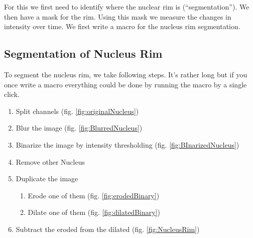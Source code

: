 \documentclass[11pt,a4paper,oneside]{report}
\begin{document}
For this we first need to identify where the nuclear rim is (``segmentation''). We then have a mask for the rim. Using this mask we measure the changes in intensity over time. We first write a macro for the nucleus rim segmentation. 

\subsection{Segmentation of Nucleus Rim}

To segment the nucleus rim, we take following steps. It's rather long but if you once write a macro everything could be done by running the macro by a single click. 

\begin{enumerate}
  \item Split channels (fig. \ref{fig:originalNucleus})
    \item Blur the image (fig. \ref{fig:BlurredNucleus})
    \item Binarize the image by intensity thresholding (fig. \ref{fig:BInarizedNucleus})
    \item Remove other Nucleus
    \item Duplicate the image
    \begin{enumerate}
        \item Erode one of them (fig. \ref{fig:erodedBinary})

        \item Dilate one of them (fig. \ref{fig:dilatedBinary})

    \end{enumerate}
    \item Subtract the eroded from the dilated (fig. \ref{fig:NucleusRim})

\end{enumerate}
\end{document}
